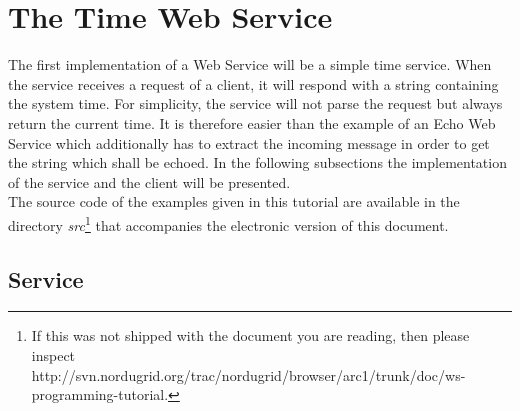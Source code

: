 \chapter{The Time Web Service}


The first implementation of a Web Service will be a simple time service. 
When the service receives a request of a client, it will respond with a string containing the system time.
For simplicity, the service will not parse the request but always return the current time.
It is therefore easier than the example of an Echo Web Service which additionally has to extract the incoming message in order to get the string which shall be echoed.
In the following subsections the implementation of the service and the client will be presented.\\

The source code of the examples given in this tutorial are available in the directory \textit{src}\footnote{If this was not shipped with the document you are reading, then please inspect\\ http://svn.nordugrid.org/trac/nordugrid/browser/arc1/trunk/doc/ws-programming-tutorial.} that accompanies the electronic version of this document.

\section{Service}

